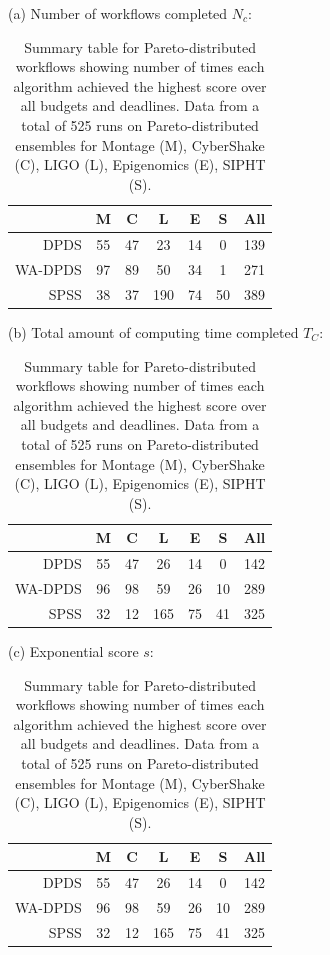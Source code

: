 \documentclass{sig-alternate}
\begin{document}

\begin{table}[tb]
\centering

(a) Number of workflows completed $N_c$:
\medskip
\begin{tabular}{r|cccccc}
 & M & C & L & E & S & All\tabularnewline
\hline
DPDS      &    55 &  47  & 23  & 14  &  0 & 139\tabularnewline 
WA-DPDS   &    97 &  89  & 50  & 34  &  1 & 271\tabularnewline 
SPSS      &    38 &  37  & 190 & 74  & 50 & 389\tabularnewline
\end{tabular}
\medskip

(b) Total amount of computing time completed $T_C$:
\medskip
\begin{tabular}{r|cccccc}
 & M & C & L & E & S & All\tabularnewline
\hline
DPDS      &   55  & 47  &  26  & 14  &  0 & 142\tabularnewline
WA-DPDS   &   96  & 98  &  59  & 26  & 10 & 289\tabularnewline
SPSS      &   32  & 12  & 165  & 75  & 41 & 325\tabularnewline
\end{tabular}
\medskip

(c) Exponential score $s$:
\medskip
\begin{tabular}{r|cccccc}
 & M & C & L & E & S & All\tabularnewline
\hline
DPDS      &   55  & 47  &  26  & 14  &  0 & 142\tabularnewline
WA-DPDS   &   96  & 98  &  59  & 26  & 10 & 289\tabularnewline
SPSS      &   32  & 12  & 165  & 75  & 41 & 325\tabularnewline
\end{tabular}
\medskip

\caption{Summary table for Pareto-distributed workflows showing number of times
each algorithm achieved the highest score over all budgets and deadlines. Data from a total of 525 runs on 
Pareto-distributed ensembles for Montage (M), CyberShake (C), LIGO (L), 
Epigenomics (E), SIPHT (S).
\label{tab:num-dags-pareto}}
\end{table}

\end{document}
